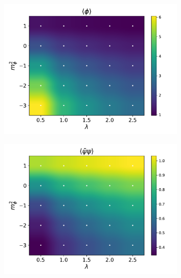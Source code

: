 \begin{figure}[]
    \centering
    \begin{subfigure}[b]{0.47\textwidth}
        \includegraphics[width=\textwidth]{figures/phase_diagram/m-lam/phase_diagram_phi.pdf}
    \end{subfigure}
    \begin{subfigure}[b]{0.47\textwidth}
        \includegraphics[width=\textwidth]{figures/phase_diagram/m-lam/phase_diagram_cond.pdf}
    \end{subfigure}
    \begin{subfigure}[b]{0.47\textwidth}

\end{subfigure}
\end{figure}
